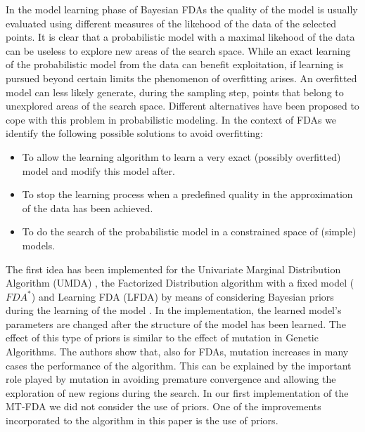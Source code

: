 \documentclass[runningheads]{llncs}
\begin{document}
 In the model learning phase of Bayesian FDAs \cite{Pelikan_et_al:1999,Larranhaga_et_Lozano:2001} the quality
 of the model is usually evaluated  using different measures of the likehood of the
 data of the selected points. It is clear that a probabilistic model with a
 maximal likehood of the data can be useless to explore new areas of the search
 space. While an exact learning
of the probabilistic model from the data can benefit exploitation, if learning
is pursued beyond certain limits the phenomenon of overfitting arises. An overfitted  model  can less likely generate, during the sampling step, points that belong 
to unexplored areas of the search space.  Different alternatives have been
 proposed to cope with this problem in probabilistic modeling. In the context of FDAs
 we identify the following possible solutions to avoid overfitting:

  \begin{itemize}
  \item To allow the learning algorithm to learn a very exact (possibly overfitted)
    model and modify this model after.
  \item To stop the learning process when a predefined quality in the approximation
     of the data has been achieved. 
  \item To do the search of the probabilistic model in a constrained space of
     (simple) models.
    
  
  \end{itemize}


 The first idea has been implemented for the Univariate Marginal Distribution
 Algorithm (UMDA) \cite{Muhlenbein_and_Paas:1996}, the Factorized Distribution
 algorithm with a fixed model ($FDA^*$) \cite{Muhlenbein_et_al:1999}
  and Learning FDA (LFDA) \cite{Muehlenbein_et_Mahnig:2001a} by means of considering
 Bayesian priors during the learning of the model
 \cite{Mahnig_and_Muehlenbein:2001a}. In the implementation, the learned
 model's parameters are changed after the structure of the model has been learned. The effect of this type of priors is similar to
 the effect of mutation in Genetic Algorithms.  The authors show that, also for FDAs,
 mutation increases in many cases the performance of the algorithm. This can be
 explained by the important role played by mutation in avoiding premature convergence
 and allowing the exploration of new
 regions during the search. In our first implementation of the MT-FDA we did not consider the use of
 priors. One of the improvements incorporated to the algorithm in  this paper is the
 use of priors.
 
\end{document}
